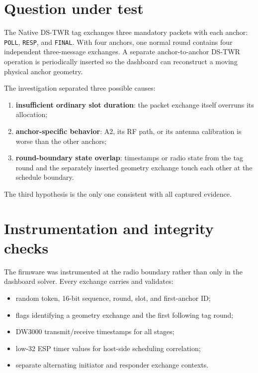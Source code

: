 \documentclass[11pt,a4paper]{article}
\newcommand{\dstwr}{DS-TWR}
\begin{document}
\section{Question under test}

The Native \dstwr{} tag exchanges three mandatory packets with each anchor:
\texttt{POLL}, \texttt{RESP}, and \texttt{FINAL}. With four anchors, one
normal round contains four independent three-message exchanges. A separate
anchor-to-anchor \dstwr{} operation is periodically inserted so the dashboard
can reconstruct a moving physical anchor geometry.

The investigation separated three possible causes:

\begin{enumerate}[leftmargin=8mm]
  \item \textbf{insufficient ordinary slot duration}: the packet exchange
  itself overruns its allocation;
  \item \textbf{anchor-specific behavior}: A2, its RF path, or its antenna
  calibration is worse than the other anchors;
  \item \textbf{round-boundary state overlap}: timestamps or radio state from
  the tag round and the separately inserted geometry exchange touch each
  other at the schedule boundary.
\end{enumerate}

The third hypothesis is the only one consistent with all captured evidence.

\section{Instrumentation and integrity checks}

The firmware was instrumented at the radio boundary rather than only in the
dashboard solver. Every exchange carries and validates:

\begin{itemize}[leftmargin=7mm]
  \item random token, 16-bit sequence, round, slot, and first-anchor ID;
  \item flags identifying a geometry exchange and the first following tag
  round;
  \item DW3000 transmit/receive timestamps for all stages;
  \item low-32 ESP timer values for host-side scheduling correlation;
  \item separate alternating initiator and responder exchange contexts.
\end{itemize}
\end{document}
